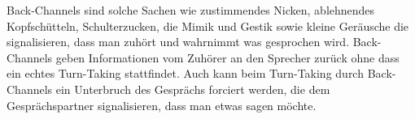Back-Channels sind solche Sachen wie zustimmendes Nicken, ablehnendes Kopfschütteln,
Schulterzucken, die Mimik und Gestik sowie kleine Geräusche die signalisieren, dass man zuhört und wahrnimmt was gesprochen wird.
Back-Channels geben Informationen vom Zuhörer an den Sprecher zurück ohne dass ein echtes Turn-Taking stattfindet. 
Auch kann beim Turn-Taking durch Back-Channels ein Unterbruch des Gesprächs forciert werden, die dem Gesprächspartner signalisieren,
dass man etwas sagen möchte.  
